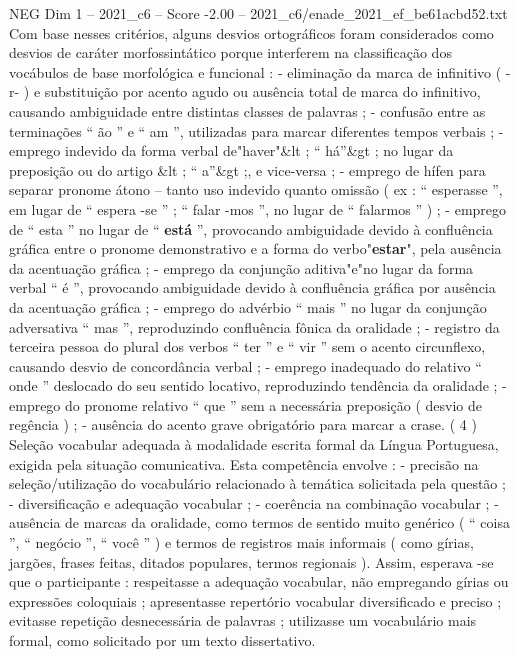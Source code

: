 \begin{textsample}{NEG Dim 1 – 2021\_c6 – Score -2.00 – 2021\_c6/enade\_2021\_ef\_be61acbd52.txt}
Com base nesses critérios, alguns desvios ortográficos foram considerados como desvios de caráter morfossintático porque interferem na classificação dos vocábulos de base morfológica e funcional : - eliminação da marca de infinitivo ( -r- ) e substituição por acento agudo ou ausência total de marca do infinitivo, causando ambiguidade entre distintas classes de palavras ; - confusão entre as terminações “ ão ” e “ am ”, utilizadas para marcar diferentes tempos verbais ; - emprego indevido da forma verbal de"haver"\&lt ; “ há”\&gt ; no lugar da preposição ou do artigo \&lt ; “ a”\&gt ;, e vice-versa ; - emprego de hífen para separar pronome átono – tanto uso indevido quanto omissão ( ex : “ esperasse ”, em lugar de “ espera -se ” ; “ falar -mos ”, no lugar de “ falarmos ” ) ; - emprego de “ esta ” no lugar de “ \textbf{está} ”, provocando ambiguidade devido à confluência gráfica entre o pronome demonstrativo e a forma do verbo"\textbf{estar}", pela ausência da acentuação gráfica ; - emprego da conjunção aditiva"e"no lugar da forma verbal “ é ”, provocando ambiguidade devido à confluência gráfica por ausência da acentuação gráfica ; - emprego do advérbio “ mais ” no lugar da conjunção adversativa “ mas ”, reproduzindo confluência fônica da oralidade ; - registro da terceira pessoa do plural dos verbos “ ter ” e “ vir ” sem o acento circunflexo, causando desvio de concordância verbal ; - emprego inadequado do relativo “ onde ” deslocado do seu sentido locativo, reproduzindo tendência da oralidade ; - emprego do pronome relativo “ que ” sem a necessária preposição ( desvio de regência ) ; - ausência do acento grave obrigatório para marcar a crase. ( 4 ) Seleção vocabular adequada à modalidade escrita formal da Língua Portuguesa, exigida pela situação comunicativa.
Esta competência envolve : - precisão na seleção/utilização do vocabulário relacionado à temática solicitada pela questão ; - diversificação e adequação vocabular ; - coerência na combinação vocabular ; - ausência de marcas da oralidade, como termos de sentido muito genérico ( “ coisa ”, “ negócio ”, “ você ” ) e termos de registros mais informais ( como gírias, jargões, frases feitas, ditados populares, termos regionais ).
Assim, esperava -se que o participante : respeitasse a adequação vocabular, não empregando gírias ou expressões coloquiais ; apresentasse repertório vocabular diversificado e preciso ; evitasse repetição desnecessária de palavras ; utilizasse um vocabulário mais formal, como solicitado por um texto dissertativo.

\end{textsample}
